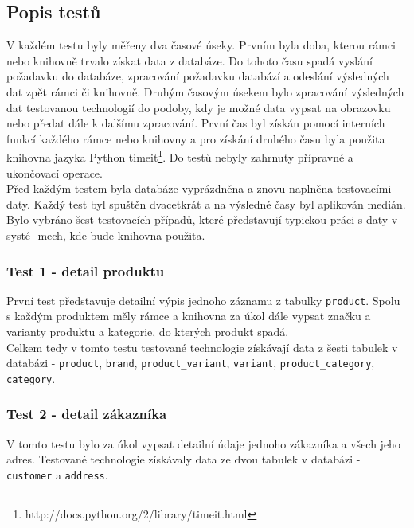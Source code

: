 \documentclass[ing,male,java,dept456]{diploma}						%
\begin{document}
\subsection{Popis testů}
V každém testu byly měřeny dva časové úseky. Prvním byla doba, kterou rámci nebo knihovně trvalo získat data z databáze. Do tohoto času spadá vyslání požadavku do databáze, zpracování požadavku databází a odeslání výsledných dat zpět rámci či knihovně. Druhým časovým úsekem bylo zpracování výsledných dat testovanou technologií do podoby, kdy je možné data vypsat na obrazovku nebo předat dále k dalšímu zpracování. První čas byl získán pomocí interních funkcí každého rámce nebo knihovny a pro získání druhého času byla použita knihovna jazyka Python timeit\footnote{http://docs.python.org/2/library/timeit.html}. Do testů nebyly zahrnuty přípravné a ukončovací operace. \\
Před každým testem byla databáze vyprázdněna a znovu naplněna testovacími daty. Každý test byl spuštěn dvacetkrát a na výsledné časy byl aplikován medián. \\
Bylo vybráno šest testovacích případů, které představují typickou práci s daty v systé-
mech, kde bude knihovna použita.

\subsubsection{Test 1 - detail produktu}
První test představuje detailní výpis jednoho záznamu z tabulky \lstinline[style=inlinepython]|product|. Spolu s každým produktem měly rámce a knihovna za úkol dále vypsat značku a varianty produktu a kategorie, do kterých produkt spadá. \\
Celkem tedy v tomto testu testované technologie získávají data z šesti tabulek v databázi - \lstinline[style=inlinepython]|product|, \lstinline[style=inlinepython]|brand|, \lstinline[style=inlinepython]|product_variant|, \lstinline[style=inlinepython]|variant|, \lstinline[style=inlinepython]|product_category|, \lstinline[style=inlinepython]|category|.

\subsubsection{Test 2 - detail zákazníka}
V tomto testu bylo za úkol vypsat detailní údaje jednoho zákazníka a všech jeho adres. Testované technologie získávaly data ze dvou tabulek v databázi - \lstinline[style=inlinepython]|customer| a \lstinline[style=inlinepython]|address|.
\end{document}

